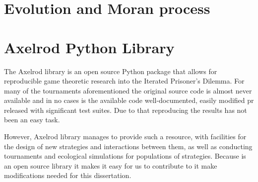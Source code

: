 \section{Evolution and Moran process}

\section{Axelrod Python Library}

The Axelrod library is an open source Python package that allows for
reproducible game theoretic research into the Iterated Prisoner's Dilemma.
For many of the tournaments aforementioned the original source code is almost never
available and in no cases is the available code well-documented, easily modified
pr released with significant test suites. Due to that reproducing the results has
not been an easy task.

However, Axelrod library manages to provide such a resource, with facilities for
the design of new strategies and interactions between them, as well as
conducting tournaments and ecological simulations for populations of strategies.
Because is an open source library it makes it easy for us to contribute to it
make modifications needed for this dissertation.

